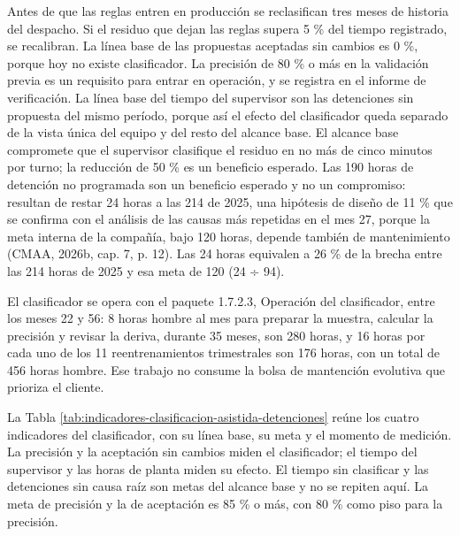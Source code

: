 \documentclass[anexo]{../../comun/overfore}
\begin{document}
Antes de que las reglas entren en producción se reclasifican tres meses de historia del despacho. Si el residuo que dejan las reglas supera 5 \% del tiempo registrado, se recalibran. La línea base de las propuestas aceptadas sin cambios es 0 \%, porque hoy no existe clasificador. La precisión de 80 \% o más en la validación previa es un requisito para entrar en operación, y se registra en el informe de verificación. La línea base del tiempo del supervisor son las detenciones sin propuesta del mismo período, porque así el efecto del clasificador queda separado de la vista única del equipo y del resto del alcance base. El alcance base compromete que el supervisor clasifique el residuo en no más de cinco minutos por turno; la reducción de 50 \% es un beneficio esperado. Las 190 horas de detención no programada son un beneficio esperado y no un compromiso: resultan de restar 24 horas a las 214 de 2025, una hipótesis de diseño de 11 \% que se confirma con el análisis de las causas más repetidas en el mes 27, porque la meta interna de la compañía, bajo 120 horas, depende también de mantenimiento (CMAA, 2026b, cap. 7, p. 12). Las 24 horas equivalen a 26 \% de la brecha entre las 214 horas de 2025 y esa meta de 120 (24 ÷ 94).

El clasificador se opera con el paquete 1.7.2.3, Operación del clasificador, entre los meses 22 y 56: 8 horas hombre al mes para preparar la muestra, calcular la precisión y revisar la deriva, durante 35 meses, son 280 horas, y 16 horas por cada uno de los 11 reentrenamientos trimestrales son 176 horas, con un total de 456 horas hombre. Ese trabajo no consume la bolsa de mantención evolutiva que prioriza el cliente.

La Tabla \ref{tab:indicadores-clasificacion-asistida-detenciones} reúne los cuatro indicadores del clasificador, con su línea base, su meta y el momento de medición. La precisión y la aceptación sin cambios miden el clasificador; el tiempo del supervisor y las horas de planta miden su efecto. El tiempo sin clasificar y las detenciones sin causa raíz son metas del alcance base y no se repiten aquí. La meta de precisión y la de aceptación es 85 \% o más, con 80 \% como piso para la precisión.
\end{document}
